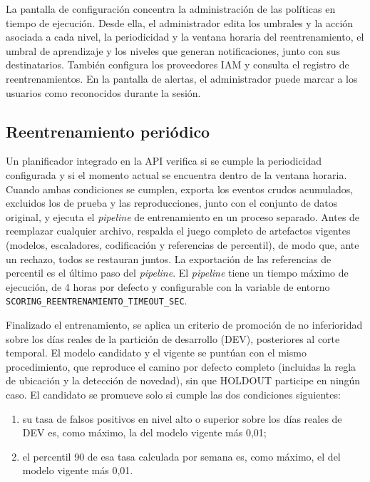 La pantalla de configuración concentra la administración de las políticas en tiempo de ejecución. Desde ella, el administrador edita los umbrales y la acción asociada a cada nivel, la periodicidad y la ventana horaria del reentrenamiento, el umbral de aprendizaje y los niveles que generan notificaciones, junto con sus destinatarios. También configura los proveedores IAM y consulta el registro de reentrenamientos. En la pantalla de alertas, el administrador puede marcar a los usuarios como reconocidos durante la sesión.

\subsection{Reentrenamiento periódico}
\label{sec:reentrenamiento-producto}
Un planificador integrado en la API verifica si se cumple la periodicidad configurada y si el momento actual se encuentra dentro de la ventana horaria. Cuando ambas condiciones se cumplen, exporta los eventos crudos acumulados, excluidos los de prueba y las reproducciones, junto con el conjunto de datos original, y ejecuta el \emph{pipeline} de entrenamiento en un proceso separado. Antes de reemplazar cualquier archivo, respalda el juego completo de artefactos vigentes (modelos, escaladores, codificación y referencias de percentil), de modo que, ante un rechazo, todos se restauran juntos. La exportación de las referencias de percentil es el último paso del \emph{pipeline}. El \emph{pipeline} tiene un tiempo máximo de ejecución, de 4 horas por defecto y configurable con la variable de entorno \texttt{SCORING\_REENTRENAMIENTO\_TIMEOUT\_SEC}.

Finalizado el entrenamiento, se aplica un criterio de promoción de no inferioridad sobre los días reales de la partición de desarrollo (DEV), posteriores al corte temporal. El modelo candidato y el vigente se puntúan con el mismo procedimiento, que reproduce el camino por defecto completo (incluidas la regla de ubicación y la detección de novedad), sin que HOLDOUT participe en ningún caso. El candidato se promueve solo si cumple las dos condiciones siguientes:
\begin{enumerate}[label=(\alph*)]
	\item su tasa de falsos positivos en nivel alto o superior sobre los días reales de DEV es, como máximo, la del modelo vigente más 0,01;
	\item el percentil 90 de esa tasa calculada por semana es, como máximo, el del modelo vigente más 0,01.
\end{enumerate}


